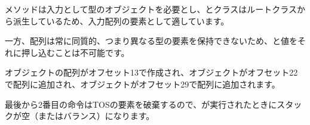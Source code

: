 メソッドは入力として型のオブジェクトを必要とし、とクラスはルートクラスから派生しているため、入力配列の要素として適しています。

一方、配列は常に同質的、つまり異なる型の要素を保持できないため、と値をそれに押し込むことは不可能です。


オブジェクトの配列がオフセット13で作成され、オブジェクトがオフセット22で配列に追加され、オブジェクトがオフセット29で配列に追加されます。


最後から2番目の命令は\ac{TOS}の要素を破棄するので、が実行されたときにスタックが空（またはバランス）になります。
